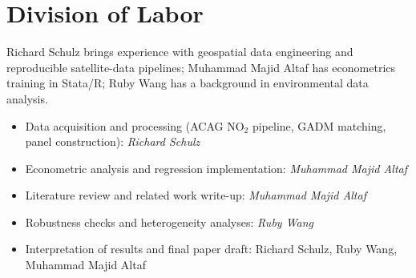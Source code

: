 \documentclass[12pt]{article}
\begin{document}
\section*{Division of Labor}

Richard Schulz brings experience with geospatial data engineering and reproducible satellite-data pipelines; Muhammad Majid Altaf has econometrics training in Stata/R; Ruby Wang has a background in environmental data analysis.

\begin{itemize}
    \item Data acquisition and processing (ACAG NO$_2$ pipeline, GADM matching, panel construction): \textit{Richard Schulz}
    \item Econometric analysis and regression implementation: \textit{Muhammad Majid Altaf}
    \item Literature review and related work write-up: \textit{Muhammad Majid Altaf}
    \item Robustness checks and heterogeneity analyses: \textit{Ruby Wang}
    \item Interpretation of results and final paper draft: Richard Schulz, Ruby Wang, Muhammad Majid Altaf
\end{itemize}

\printbibliography
\end{document}
